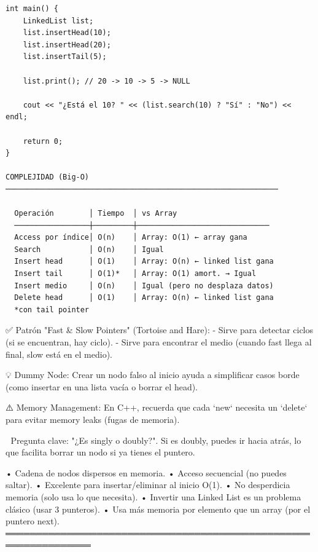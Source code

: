 \begin{lstlisting}
int main() {
    LinkedList list;
    list.insertHead(10);
    list.insertHead(20);
    list.insertTail(5);
    
    list.print(); // 20 -> 10 -> 5 -> NULL
    
    cout << "¿Está el 10? " << (list.search(10) ? "Sí" : "No") << endl;
    
    return 0;
}

COMPLEJIDAD (Big-O)
──────────────────────────────────────────────────────────────

  Operación        │ Tiempo  │ vs Array
  ─────────────────┼─────────┼──────────────────────────────
  Access por índice│ O(n)    │ Array: O(1) ← array gana
  Search           │ O(n)    │ Igual
  Insert head      │ O(1)    │ Array: O(n) ← linked list gana
  Insert tail      │ O(1)*   │ Array: O(1) amort. → Igual
  Insert medio     │ O(n)    │ Igual (pero no desplaza datos)
  Delete head      │ O(1)    │ Array: O(n) ← linked list gana
  *con tail pointer
\end{lstlisting}

\begin{dsaentrevistas}

✅ Patrón "Fast \& Slow Pointers" (Tortoise and Hare):
   - Sirve para detectar ciclos (si se encuentran, hay ciclo).
   - Sirve para encontrar el medio (cuando fast llega al final, slow 
     está en el medio).

💡 Dummy Node: Crear un nodo falso al inicio ayuda a simplificar casos
   borde (como insertar en una lista vacía o borrar el head).

⚠️ Memory Management: En C++, recuerda que cada `new` necesita un `delete`
   para evitar memory leaks (fugas de memoria).

🔑 Pregunta clave: "¿Es singly o doubly?". Si es doubly, puedes ir hacia
   atrás, lo que facilita borrar un nodo si ya tienes el puntero.

\end{dsaentrevistas}

\begin{dsaresumen}

• Cadena de nodos dispersos en memoria.
• Acceso secuencial (no puedes saltar).
• Excelente para insertar/eliminar al inicio O(1).
• No desperdicia memoria (solo usa lo que necesita).
• Invertir una Linked List es un problema clásico (usar 3 punteros).
• Usa más memoria por elemento que un array (por el puntero next).
════════════════════════════════════════════════════════════════

\end{dsaresumen}


